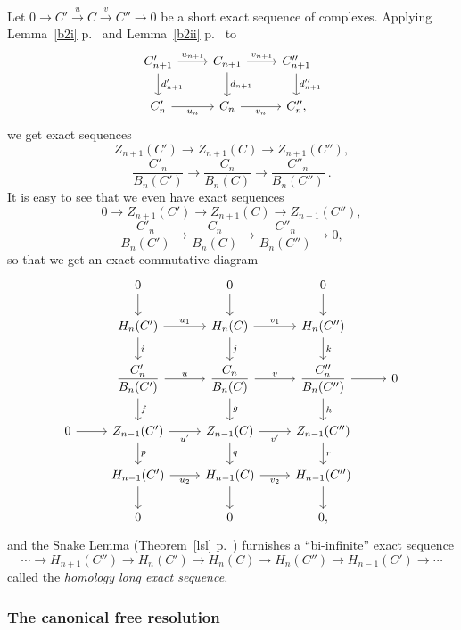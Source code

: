 \documentclass[parskip=half,fontsize=12pt]{scrartcl}%
\newcommand{\ds}{\displaystyle}
\newcommand{\xr}{\xrightarrow}
\begin{document}
Let $0\to C'\xr uC\xr vC''\to0$ be a short exact sequence of complexes. Applying Lemma~\ref{b2i} p.~\pageref{b2i} and Lemma~\ref{b2ii} p.~\pageref{b2ii} to %
$$
\begin{tikzcd}
C'_{n+1}\ar[d,"d'_{n+1}"]\ar[r,"u_{n+1}"]&C_{n+1}\ar[d,"d_{n+1}"]\ar[r,"v_{n+1}"]&C''_{n+1}\ar[d,"d''_{n+1}"]\\ 
C'_n\ar[r,"u_n"']&C_n\ar[r,"v_n"']&C''_n,
\end{tikzcd}
$$ 
we get exact sequences 
$$
Z_{n+1}(C')\to Z_{n+1}(C)\to Z_{n+1}(C''),
$$ 
$$
\frac{C'_n}{B_n(C')}\to\frac{C_n}{B_n(C)}\to\frac{C''_n}{B_n(C'')}\ .
$$ 
It is easy to see that we even have exact sequences 
$$
0\to Z_{n+1}(C')\to Z_{n+1}(C)\to Z_{n+1}(C''),
$$ 
$$
\frac{C'_n}{B_n(C')}\to\frac{C_n}{B_n(C)}\to\frac{C''_n}{B_n(C'')}\to0,
$$ 
so that we get an exact commutative diagram 
$$
\begin{tikzcd}
&0\ar{d}&0\ar{d}&0\ar{d}\\ 
&H_n(C')\ar["u_1"]{r}\ar["i"]{d}&H_n(C)\ar["v_1"]{r}\ar["j"]{d}&H_n(C'')\ar["k"]{d}\\ 
&\ds\frac{C'_n}{B_n(C')}\ar["u"]{r}\ar["f"]{d}&\ds\frac{C_n}{B_n(C)}\ar["v"]{r}\ar["g"]{d}&\ds\frac{C''_n}{B_n(C'')}\ar["h"]{d}\ar{r}&0\\ 
0\ar{r}&Z_{n-1}(C')\ar["u'"']{r}\ar["p"]{d}&Z_{n-1}(C)\ar["v'"']{r}\ar["q"]{d}&Z_{n-1}(C'')\ar["r"]{d}\\ 
&H_{n-1}(C')\ar["u_2"']{r}\ar{d}&H_{n-1}(C)\ar["v_2"']{r}\ar{d}&H_{n-1}(C'')\ar{d}\\ 
&0&0&0,
\end{tikzcd}
$$ 
and the Snake Lemma (Theorem~\ref{lsl} p.~\pageref{lsl}) furnishes a ``bi-infinite'' exact sequence 
$$
\cdots\to H_{n+1}(C'')\to H_n(C')\to H_n(C)\to H_n(C'')\to H_{n-1}(C')\to\cdots
$$ 
called the \emph{homology long exact sequence.}


\subsubsection{The canonical free resolution}
\end{document}
